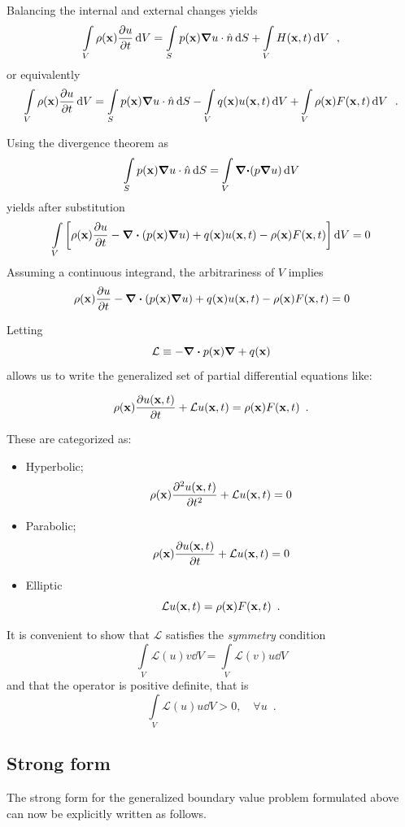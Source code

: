 Balancing the internal and external changes yields
\[\int\limits_V \rho (\vb x)\pdv{u}{t}\dd{V} = \int\limits_S p(\vb x)\vb \grad u \cdot \hat n\dd{S}  + \int\limits_V H(\vb x, t)\dd{V} \enspace ,\]
or equivalently
\[\int\limits_V \rho (\vb x)\pdv{u}{t}\dd{V} = \int\limits_S p(\vb x)\vb \grad u \cdot \hat n\dd{S}   - \int\limits_V q(\vb x)u(\vb x, t)\dd{V}  + \int\limits_V \rho (\vb x)F(\vb x, t)\dd{V} \enspace .\]

Using the divergence theorem as
\[\int\limits_S p(\vb x) \grad u \cdot \hat n \dd{S}  = \int\limits_V \vb \div  (p\vb \grad u)\dd{V}\]
yields after substitution
\[\int\limits_V \left[\rho (\vb x)\pdv{u}{t} - \div (p(\vb x)\grad u) + q(\vb x)u(\vb x, t) - \rho (\vb x)F(\vb x, t)\right]\dd{V}  = 0\]
Assuming a continuous integrand, the arbitrariness of $V$ implies
\[\rho (\vb x)\pdv{u}{t} - \div(p(\vb x)\grad u) + q(\vb x)u(\vb x, t) - \rho (\vb x)F(\vb x, t) = 0\]

Letting
\[\mathcal{L} \equiv  - \div p(\vb x)\grad + q(\vb x)\]
allows us to write the generalized set of partial differential equations like:

\begin{equation}
\rho(\vb x) \pdv{u(\vb x, t)}{t} + \mathcal{L}u(\vb x, t) = \rho (\vb x)F(\vb x, t) \enspace .
\label{eq:GenPDE}
\end{equation}

These are categorized as:
\begin{itemize}
    \item Hyperbolic;
    \[\rho(\vb x) \pdv[2]{u(\vb x, t)}{t} + \mathcal{L}u(\vb x,t) = 0\]

    \item Parabolic;
    \[\rho(\vb x) \pdv{u(\vb x,t)}{t} + \mathcal{L}u(\vb x, t) = 0\]

    \item Elliptic
    \[\mathcal{L}u(\vb x, t) = \rho (\vb x)F(\vb x, t) \enspace .\]
\end{itemize}

It is convenient to show that $\mathcal{L}$ satisfies the \emph{symmetry} condition
\[\int\limits_V \mathcal{L}(u)v\dd{V} =  \int\limits_V \mathcal{L}(v)u \dd{V}\]
and that the operator is positive definite, that is
\[\int\limits_V \mathcal{L}(u)u\dd{V}  > 0, \quad \forall u \enspace .\]

\subsection{Strong form}
The strong form for the generalized boundary value problem formulated above can now be explicitly written as follows.


